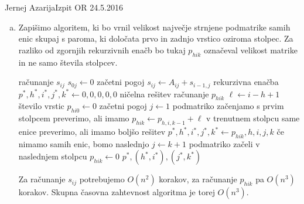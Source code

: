 \begin{naloga}{Jernej Azarija}{Izpit OR 24.5.2016}
\begin{odgovor}
\begin{enumerate}[(a)]
\item Zapišimo algoritem,
ki bo vrnil velikost največje strnjene podmatrike samih enic skupaj s paroma,
ki določata prvo in zadnjo vrstico oziroma stolpec.
Za razliko od zgornjih rekurzivnih enačb
bo tukaj $p_{hik}$ označeval velikost matrike in ne samo števila stolpcev.
\begin{small}
\begin{algorithmic}
	 \hfill računanje $s_{ij}$
		\State $s_{0j} \gets 0$ \hfill začetni pogoj
			\State $s_{ij} \gets A_{ij} + s_{i-1,j}$ \hfill rekurzivna enačba
		\EndFor
	\EndFor
	\State $p^*, h^*, i^*, j^*, k^* \gets 0, 0, 0, 0, 0$
		\hfill ničelna rešitev
	 \hfill računanje $p_{hik}$
			\State $\ell \gets i - h + 1$ \hfill število vrstic
			\State $p_{hi0} \gets 0$ \hfill začetni pogoj
			\State $j \gets 1$ \hfill podmatriko začenjamo s prvim stolpcem
				 \hfill preverimo, ali imamo
					\State $p_{hik} \gets p_{h,i,k-1} + \ell$
						\hfill v trenutnem stolpcu same enice
							\hfill preverimo, ali imamo boljšo rešitev
						\State $p^*, h^*, i^*, j^*, k^* \gets p_{hik}, h, i, j, k$
					\EndIf
				\Else \hfill če nimamo samih enic, bomo naslednjo
					\State $j \gets k+1$
						\hfill podmatriko začeli v naslednjem stolpcu
					\State $p_{hik} \gets 0$
				\EndIf
			\EndFor
		\EndFor
	\EndFor
	\State \Return $p^*, (h^*, i^*), (j^*, k^*)$
\EndFunction
\end{algorithmic}
\end{small}
Za računanje $s_{ij}$ potrebujemo $O(n^2)$ korakov,
za računanje $p_{hik}$ pa $O(n^3)$ korakov.
Skupna časovna zahtevnost algoritma je torej $O(n^3)$.
\end{enumerate}
\end{odgovor}
\end{naloga}
